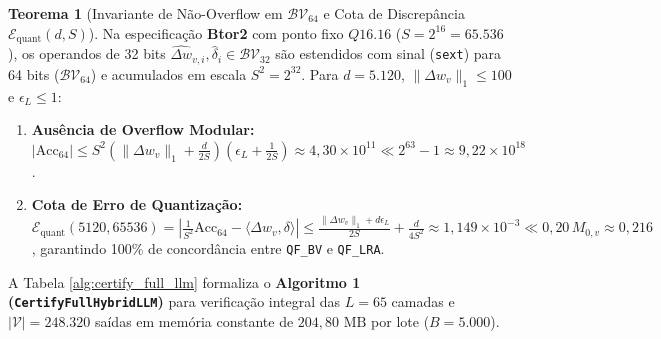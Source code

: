 \documentclass[11pt,a4paper]{article}
\theoremstyle{definition}
\newtheorem{theorem}{Teorema}
\begin{document}
\begin{theorem}[Invariante de Não-Overflow em $\mathcal{BV}_{64}$ e Cota de Discrepância $\mathcal{E}_{\text{quant}}(d, S)$]
\label{thm:bv64_soundness}
Na especificação \textbf{Btor2} com ponto fixo $Q16.16$ ($S = 2^{16} = 65.536$), os operandos de 32 bits $\widehat{\Delta w}_{v,i}, \hat{\delta}_i \in \mathcal{BV}_{32}$ são estendidos com sinal (\texttt{sext}) para 64 bits ($\mathcal{BV}_{64}$) e acumulados em escala $S^2 = 2^{32}$. Para $d = 5.120$, $\|\Delta w_v\|_1 \le 100$ e $\epsilon_L \le 1$:
\begin{enumerate}
    \item \textbf{Ausência de Overflow Modular:} $|\mathrm{Acc}_{64}| \le S^2(\|\Delta w_v\|_1 + \frac{d}{2S})(\epsilon_L + \frac{1}{2S}) \approx 4{,}30 \times 10^{11} \ll 2^{63}-1 \approx 9{,}22 \times 10^{18}$.
    \item \textbf{Cota de Erro de Quantização:} $\mathcal{E}_{\text{quant}}(5120, 65536) = |\frac{1}{S^2}\mathrm{Acc}_{64} - \langle \Delta w_v, \delta \rangle| \le \frac{\|\Delta w_v\|_1 + d\epsilon_L}{2S} + \frac{d}{4S^2} \approx 1{,}149 \times 10^{-3} \ll 0{,}20\,M_{0,v} \approx 0{,}216$, garantindo 100\% de concordância entre \texttt{QF\_BV} e \texttt{QF\_LRA}.
\end{enumerate}
\end{theorem}

A Tabela \ref{alg:certify_full_llm} formaliza o \textbf{Algoritmo 1 (\texttt{CertifyFullHybridLLM})} para verificação integral das $L=65$ camadas e $|\mathcal{V}|=248.320$ saídas em memória constante de $204{,}80\text{ MB}$ por lote ($B=5.000$).
\end{document}
